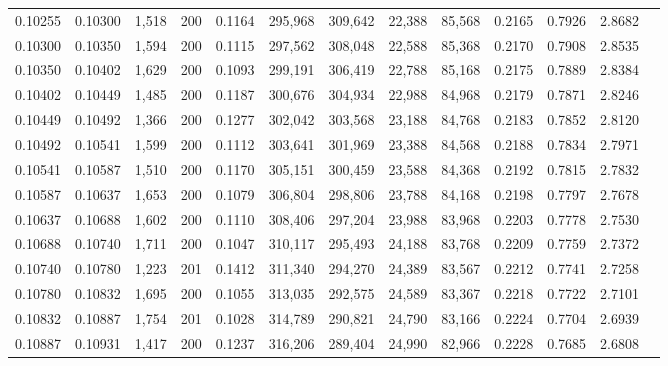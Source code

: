 \begin{tabular}{rrrrrrrrrrrrr}
0.10255 & 0.10300 & 1,518 & 200 &                                     0.1164 & 295,968 & 309,642 &  22,388 &  85,568 & 0.2165 & 0.7926 & 2.8682 \\
0.10300 & 0.10350 & 1,594 & 200 &                                     0.1115 & 297,562 & 308,048 &  22,588 &  85,368 & 0.2170 & 0.7908 & 2.8535 \\
0.10350 & 0.10402 & 1,629 & 200 &                                     0.1093 & 299,191 & 306,419 &  22,788 &  85,168 & 0.2175 & 0.7889 & 2.8384 \\
0.10402 & 0.10449 & 1,485 & 200 &                                     0.1187 & 300,676 & 304,934 &  22,988 &  84,968 & 0.2179 & 0.7871 & 2.8246 \\
0.10449 & 0.10492 & 1,366 & 200 &                                     0.1277 & 302,042 & 303,568 &  23,188 &  84,768 & 0.2183 & 0.7852 & 2.8120 \\
0.10492 & 0.10541 & 1,599 & 200 &                                     0.1112 & 303,641 & 301,969 &  23,388 &  84,568 & 0.2188 & 0.7834 & 2.7971 \\
0.10541 & 0.10587 & 1,510 & 200 &                                     0.1170 & 305,151 & 300,459 &  23,588 &  84,368 & 0.2192 & 0.7815 & 2.7832 \\
0.10587 & 0.10637 & 1,653 & 200 &                                     0.1079 & 306,804 & 298,806 &  23,788 &  84,168 & 0.2198 & 0.7797 & 2.7678 \\
0.10637 & 0.10688 & 1,602 & 200 &                                     0.1110 & 308,406 & 297,204 &  23,988 &  83,968 & 0.2203 & 0.7778 & 2.7530 \\
0.10688 & 0.10740 & 1,711 & 200 &                                     0.1047 & 310,117 & 295,493 &  24,188 &  83,768 & 0.2209 & 0.7759 & 2.7372 \\
0.10740 & 0.10780 & 1,223 & 201 &                                     0.1412 & 311,340 & 294,270 &  24,389 &  83,567 & 0.2212 & 0.7741 & 2.7258 \\
0.10780 & 0.10832 & 1,695 & 200 &                                     0.1055 & 313,035 & 292,575 &  24,589 &  83,367 & 0.2218 & 0.7722 & 2.7101 \\
0.10832 & 0.10887 & 1,754 & 201 &                                     0.1028 & 314,789 & 290,821 &  24,790 &  83,166 & 0.2224 & 0.7704 & 2.6939 \\
0.10887 & 0.10931 & 1,417 & 200 &                                     0.1237 & 316,206 & 289,404 &  24,990 &  82,966 & 0.2228 & 0.7685 & 2.6808 \\

\end{tabular}
